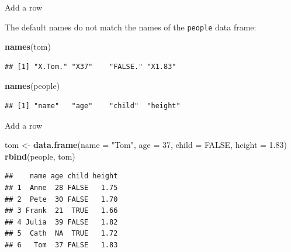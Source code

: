 \documentclass[ignorenonframetext,]{beamer}
\newenvironment{Shaded}{\begin{snugshade}}{\end{snugshade}}
\newcommand{\DataTypeTok}[1]{\textcolor[rgb]{0.13,0.29,0.53}{#1}}
\newcommand{\DecValTok}[1]{\textcolor[rgb]{0.00,0.00,0.81}{#1}}
\newcommand{\FloatTok}[1]{\textcolor[rgb]{0.00,0.00,0.81}{#1}}
\newcommand{\KeywordTok}[1]{\textcolor[rgb]{0.13,0.29,0.53}{\textbf{#1}}}
\newcommand{\NormalTok}[1]{#1}
\newcommand{\OtherTok}[1]{\textcolor[rgb]{0.56,0.35,0.01}{#1}}
\newcommand{\StringTok}[1]{\textcolor[rgb]{0.31,0.60,0.02}{#1}}
\begin{document}
\begin{frame}[fragile]{Add a row}
\protect\hypertarget{add-a-row-1}{}

The default names do not match the names of the \texttt{people} data
frame:

\begin{Shaded}
\begin{Highlighting}[]
\KeywordTok{names}\NormalTok{(tom)}
\end{Highlighting}
\end{Shaded}

\begin{verbatim}
## [1] "X.Tom." "X37"    "FALSE." "X1.83"
\end{verbatim}

\begin{Shaded}
\begin{Highlighting}[]
\KeywordTok{names}\NormalTok{(people)}
\end{Highlighting}
\end{Shaded}

\begin{verbatim}
## [1] "name"   "age"    "child"  "height"
\end{verbatim}

\end{frame}

\begin{frame}[fragile]{Add a row}
\protect\hypertarget{add-a-row-2}{}

\begin{Shaded}
\begin{Highlighting}[]
\NormalTok{tom <-}\StringTok{ }\KeywordTok{data.frame}\NormalTok{(}\DataTypeTok{name =} \StringTok{"Tom"}\NormalTok{, }\DataTypeTok{age =} \DecValTok{37}\NormalTok{, }
                  \DataTypeTok{child =} \OtherTok{FALSE}\NormalTok{, }\DataTypeTok{height =} \FloatTok{1.83}\NormalTok{)}
\KeywordTok{rbind}\NormalTok{(people, tom)}
\end{Highlighting}
\end{Shaded}

\begin{verbatim}
##    name age child height
## 1  Anne  28 FALSE   1.75
## 2  Pete  30 FALSE   1.70
## 3 Frank  21  TRUE   1.66
## 4 Julia  39 FALSE   1.82
## 5  Cath  NA  TRUE   1.72
## 6   Tom  37 FALSE   1.83
\end{verbatim}

\end{frame}
\end{document}
